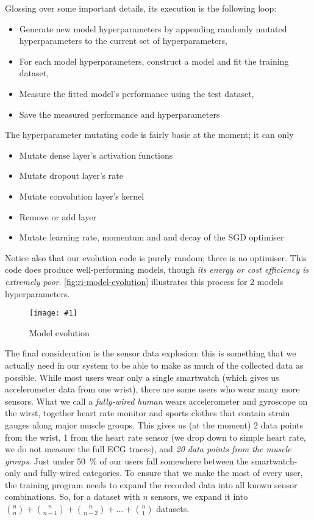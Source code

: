 \documentclass[a4paper, 10 pt, conference]{IEEEtran}
\newcommand{\fig}[3]{
  \begin{figure}[h]
    \begin{center}
        \caption{#3}
        \texttt{[image: \#1]}
        \label{fig:#2}
    \end{center}
  \end{figure}
}
\begin{document}
Glossing over some important details, its execution is the following loop:

\begin{itemize}
\item Generate new model hyperparameters by appending randomly mutated hyperparameters to the current set of hyperparameters,
\item For each model hyperparameters, construct a model and fit the training dataset,
\item Measure the fitted model's performance using the test dataset,
\item Save the measured performance and hyperparameters
\end{itemize}

The hyperparameter mutating code is fairly basic at the moment; it can only

\begin{itemize}
\item Mutate dense layer's activation functions
\item Mutate dropout layer's rate
\item Mutate convolution layer's kernel
\item Remove or add layer
\item Mutate learning rate, momentum and and decay of the SGD optimiser
\end{itemize}

Notice also that our evolution code is purely random; there is no optimiser. This code does produce well-performing models, though \emph{its energy or cost efficiency is extremely poor}. \autoref{fig:ri-model-evolution} illustrates this process for 2 models hyperparameters.

\fig{ri-model-evolution.png}{ri-model-evolution}{Model evolution}

The final consideration is the sensor data explosion: this is something that we actually need in our system to be able to make as much of the collected data as possible. While most users wear only a single smartwatch (which gives us accelerometer data from one wrist), there are some users who wear many more sensors. What we call a \emph{fully-wired human} wears accelerometer and gyroscope on the wirst, together heart rate monitor and sports clothes that contain strain gauges along major muscle groups. This gives us (at the moment) 2 data points from the wrist, 1 from the heart rate sensor (we drop down to simple heart rate, we do not measure the full ECG traces), and \emph{20 data points from the muscle groups}. Just under \SI{50}{\percent} of our users fall somewhere between the smartwatch-only and fully-wired categories. To ensure that we make the most of every user, the training program needs to expand the recorded data into all known sensor combinations. So, for a dataset with $n$ sensors, we expand it into $\binom nn + \binom n{n-1} + \binom n{n-2} + ... + \binom n1$ datasets. 
\end{document}
